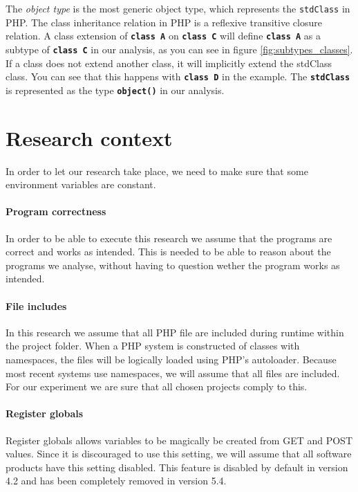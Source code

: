 \documentclass[../main.tex]{subfiles}
\begin{document}
	The \textit{object type} is the most generic object type, which represents the \texttt{stdClass} in PHP.
    The class inheritance relation in PHP is a \gls{reflexive transitive closure} relation.
    A class extension of \textbf{\texttt{class A}} on \textbf{\texttt{class C}} will define \textbf{\texttt{class A}} as a subtype of \textbf{\texttt{class C}} in our analysis, as you can see in figure \ref{fig:subtypes_classes}.
    If a class does not extend another class, it will implicitly extend the \gls{stdClass} class.
    You can see that this happens with \textbf{\texttt{class D}} in the example.
    The \textbf{\texttt{stdClass}} is represented as the type \textbf{\texttt{object()}} in our analysis.

    \pagebreak
    
    \section{Research context}\label{sec:implementation_context}
    In order to let our research take place, we need to make sure that some environment variables are constant.
    
    \paragraph{Program correctness}
    In order to be able to execute this research we assume that the programs are correct and works as intended.
    This is needed to be able to reason about the programs we analyse, without having to question wether the program works as intended.
    
    \paragraph{File includes}
    In this research we assume that all PHP file are included during runtime within the project folder. 
    When a PHP system is constructed of classes with namespaces, the files will be logically loaded using PHP's autoloader.
    Because most recent systems use namespaces, we will assume that all files are included.
    For our experiment we are sure that all chosen projects comply to this.
    
    \paragraph{Register globals}
    Register globals allows variables to be magically be created from GET and POST values.
    Since it is discouraged to use this setting, we will assume that all software products have this setting disabled.
    This feature is disabled by default in version 4.2 and has been completely removed in version 5.4.
    
\end{document}
